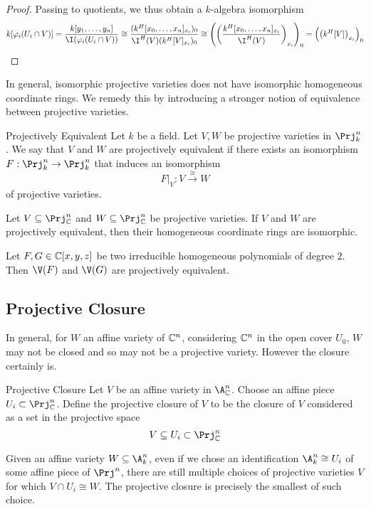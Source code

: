 \documentclass[a4paper]{article}
\begin{document}
\begin{prp}{}{}
\begin{proof}
Passing to quotients, we thus obtain a $k$-algebra isomorphism $$k[\varphi_i(U_i\cap V)]=\frac{k[y_1,\dots,y_n]}{\I(\varphi_i(U_i\cap V))}\cong\frac{(k^H[x_0,\dots,x_n]_{x_i})_0}{\I^H(V)(k^H[V]_{x_i})_0}\cong\left(\left(\frac{k^H[x_0,\dots,x_n]_{x_i}}{\I^H(V)}\right)_{x_i}\right)_0=\left(\left(k^H[V]\right)_{x_i}\right)_0$$
\end{proof}
\end{prp}

In general, isomorphic projective varieties does not have isomorphic homogeneous coordinate rings. We remedy this by introducing a stronger notion of equivalence between projective varieties. 

\begin{defn}{Projectively Equivalent}{} Let $k$ be a field. Let $V,W$ be projective varieties in $\Prj_k^n$. We say that $V$ and $W$ are projectively equivalent if there exists an isomorphism $F:\Prj_k^n\to\Prj_k^n$ that induces an isomorphism $$F|_V:V\overset{\cong}{\longrightarrow}W$$ of projective varieties. 
\end{defn}

\begin{lmm}{}{} Let $V\subseteq\Prj_\C^n$ and $W\subseteq\Prj_\C^n$ be projective varieties. If $V$ and $W$ are projectively equivalent, then their homogeneous coordinate rings are isomorphic. 
\end{lmm}

\begin{lmm}{}{} Let $F,G\in\mathbb{C}[x,y,z]$ be two irreducible homogeneous polynomials of degree $2$. Then $\V(F)$ and $\V(G)$ are projectively equivalent. 
\end{lmm}

\subsection{Projective Closure}
In general, for $W$ an affine variety of $\mathbb{C}^n$, considering $\mathbb{C}^n$ in the open cover $U_0$, $W$ may not be closed and so may not be a projective variety. However the closure certainly is. 

\begin{defn}{Projective Closure}{} Let $V$ be an affine variety in $\A_\C^n$. Choose an affine piece $U_i\subset\Prj_\C^n$. Define the projective closure of $V$ to be the closure of $V$ considered as a set in the projective space $$V\subseteq U_i\subset\Prj_\C^n$$
\end{defn}

Given an affine variety $W\subseteq\A_k^n$, even if we chose an identification $\A_k^n\cong U_i$ of some affine piece of $\Prj^n$, there are still multiple choices of projective varieties $V$ for which $V\cap U_i\cong W$. The projective closure is precisely the smallest of such choice. 
\end{document}
